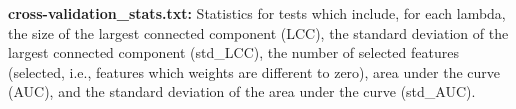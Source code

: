 \documentclass[11pt, oneside]{article}   	%
\begin{document}
{\bf cross-validation\_stats.txt:} Statistics for tests which include, for each lambda, the size of the largest connected component (LCC), the standard deviation of the largest connected component (std\_LCC), the number of selected features (selected, i.e., features which weights are different to zero), area under the curve (AUC), and the standard deviation of the area under the curve (std\_AUC).




%	






%

\end{document}
